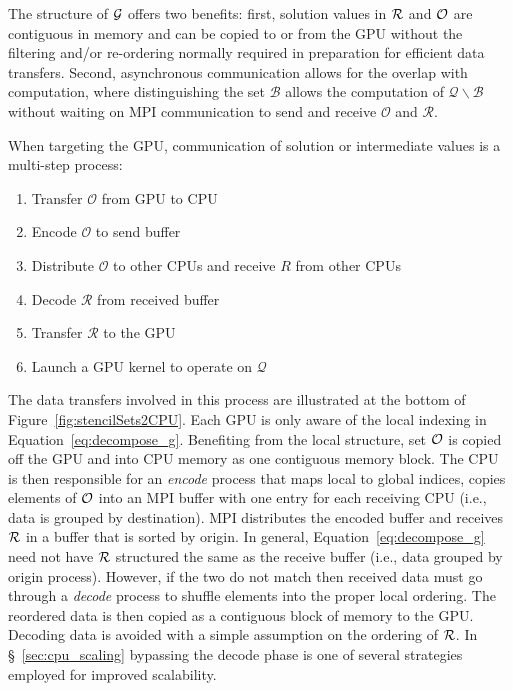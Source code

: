 \documentclass{report}
\begin{document}
 The structure of $\mathcal{G}$ offers two benefits: first, solution values in $\mathcal{R}$ and $\mathcal{O}$ are contiguous in memory and can be copied to or from the GPU without the filtering and/or re-ordering normally required in preparation for efficient data transfers. Second, asynchronous communication allows for the overlap with computation, where distinguishing the set $\mathcal{B}$ allows the computation of $\mathcal{Q}\backslash \mathcal{B}$ without waiting on MPI communication to send and receive $\mathcal{O}$ and $\mathcal{R}$. 

When targeting the GPU, communication of solution or intermediate values is a multi-step process:
   \begin{enumerate}
    \item Transfer $\mathcal{O}$ from GPU to CPU
    \item Encode $\mathcal{O}$ to send buffer
	\item Distribute $\mathcal{O}$ to other CPUs and receive $R$ from other CPUs
	\item Decode $\mathcal{R}$ from received buffer  
	\item Transfer $\mathcal{R}$ to the GPU
	\item Launch a GPU kernel to operate on $\mathcal{Q}$
   \end{enumerate} 
The data transfers involved in this process are illustrated at the bottom of Figure~\ref{fig:stencilSets2CPU}.
    Each GPU is only aware of the local indexing in Equation~\ref{eq:decompose_g}. Benefiting from the local structure, set 
$\mathcal{O}$ is copied off the GPU and into CPU memory as one contiguous memory block. The CPU is then responsible for an \emph{encode} process that maps local to global indices, copies elements of $\mathcal{O}$ into an MPI buffer with one entry for each receiving CPU (i.e., data is grouped by destination). MPI distributes the encoded buffer and receives $\mathcal{R}$ in a buffer that is sorted by origin. In general, Equation~\ref{eq:decompose_g} need not have $\mathcal{R}$ structured the same as the receive buffer (i.e., data grouped by origin process). However, if the two do not match then received data must go through a \emph{decode} process to shuffle elements into the proper local ordering. The reordered data is then copied as a contiguous block of memory to the GPU. Decoding data is avoided with a simple assumption on the ordering of $\mathcal{R}$. In \S~\ref{sec:cpu_scaling} bypassing the decode phase is one of several strategies employed for improved scalability. 
\end{document}
